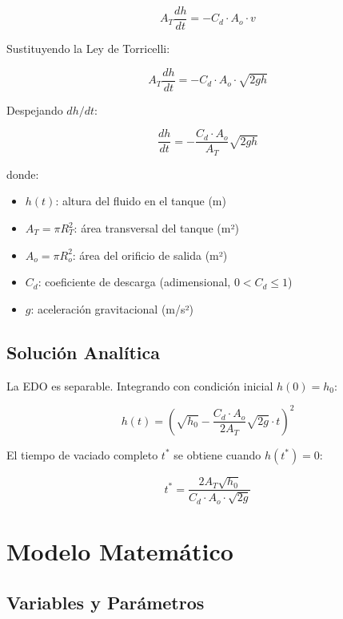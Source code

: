 \documentclass[12pt, a4paper]{article}
\begin{document}
\begin{equation}
    A_T \frac{dh}{dt} = -C_d \cdot A_o \cdot v
\end{equation}

Sustituyendo la Ley de Torricelli:

\begin{equation}
    A_T \frac{dh}{dt} = -C_d \cdot A_o \cdot \sqrt{2gh}
\end{equation}

Despejando $dh/dt$:

\begin{equation}
    \boxed{\frac{dh}{dt} = -\frac{C_d \cdot A_o}{A_T} \sqrt{2gh}}
\end{equation}

donde:
\begin{itemize}
    \item $h(t)$: altura del fluido en el tanque (m)
    \item $A_T = \pi R_T^2$: área transversal del tanque (m²)
    \item $A_o = \pi R_o^2$: área del orificio de salida (m²)
    \item $C_d$: coeficiente de descarga (adimensional, $0 < C_d \leq 1$)
    \item $g$: aceleración gravitacional (m/s²)
\end{itemize}

\subsection{Solución Analítica}

La EDO es separable. Integrando con condición inicial $h(0) = h_0$:

\begin{equation}
    h(t) = \left( \sqrt{h_0} - \frac{C_d \cdot A_o}{2 A_T}\sqrt{2g}\cdot t \right)^2
\end{equation}

El tiempo de vaciado completo $t^*$ se obtiene cuando $h(t^*) = 0$:

\begin{equation}
    t^* = \frac{2 A_T \sqrt{h_0}}{C_d \cdot A_o \cdot \sqrt{2g}}
\end{equation}

\section{Modelo Matemático}

\subsection{Variables y Parámetros}
\end{document}

